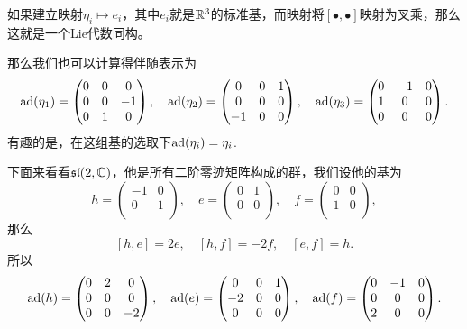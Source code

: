 如果建立映射$\eta_i\mapsto e_i$，其中$e_i$就是$\mathbb{R}^3$的标准基，而映射将$[\bullet,\bullet]$映射为叉乘，那么这就是一个Lie代数同构。

那么我们也可以计算得伴随表示为
\[
	\operatorname{ad}(\eta_1)=
		\begin{pmatrix}
			0&0&0\\
			0&0&-1\\
			0&1&0\\
		\end{pmatrix},\quad
	\operatorname{ad}(\eta_2)=
		\begin{pmatrix}
			0&0&1\\
			0&0&0\\
			-1&0&0\\
		\end{pmatrix},\quad
	\operatorname{ad}(\eta_3)=
		\begin{pmatrix}
			0&-1&0\\
			1&0&0\\
			0&0&0\\
		\end{pmatrix}.
\]
有趣的是，在这组基的选取下$\operatorname{ad}(\eta_i)=\eta_i$.

下面来看看$\mathfrak{sl}(2,\mathbb{C})$，他是所有二阶零迹矩阵构成的群，我们设他的基为
\[
h=\begin{pmatrix}
	-1&0\\
	0&1\\
\end{pmatrix},\quad
e=\begin{pmatrix}
	0&1\\
	0&0\\
\end{pmatrix},\quad
f=\begin{pmatrix}
	0&0\\
	1&0\\
\end{pmatrix},
\]
那么
\[
[h,e]=2e,\quad[h,f]=-2f,\quad[e,f]=h.
\]
所以
\[
	\operatorname{ad}(h)=
		\begin{pmatrix}
			0&2&0\\
			0&0&0\\
			0&0&-2\\
		\end{pmatrix},\quad
	\operatorname{ad}(e)=
		\begin{pmatrix}
			0&0&1\\
			-2&0&0\\
			0&0&0\\
		\end{pmatrix},\quad
	\operatorname{ad}(f)=
		\begin{pmatrix}
			0&-1&0\\
			0&0&0\\
			2&0&0\\
		\end{pmatrix}.
\]

